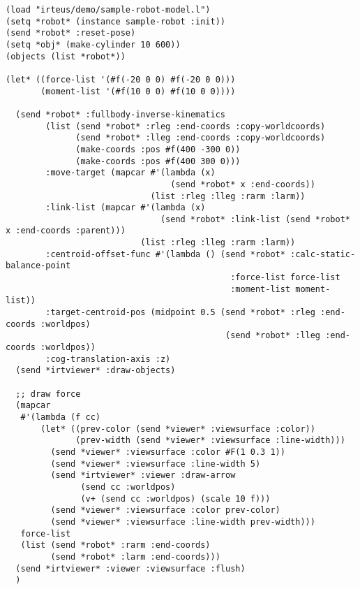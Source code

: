 {\baselineskip=10pt
\begin{verbatim}
(load "irteus/demo/sample-robot-model.l")
(setq *robot* (instance sample-robot :init))
(send *robot* :reset-pose)
(setq *obj* (make-cylinder 10 600))
(objects (list *robot*))

(let* ((force-list '(#f(-20 0 0) #f(-20 0 0)))
       (moment-list '(#f(10 0 0) #f(10 0 0))))

  (send *robot* :fullbody-inverse-kinematics
        (list (send *robot* :rleg :end-coords :copy-worldcoords)
              (send *robot* :lleg :end-coords :copy-worldcoords)
              (make-coords :pos #f(400 -300 0))
              (make-coords :pos #f(400 300 0)))
        :move-target (mapcar #'(lambda (x)
                                 (send *robot* x :end-coords))
                             (list :rleg :lleg :rarm :larm))
        :link-list (mapcar #'(lambda (x)
                               (send *robot* :link-list (send *robot* x :end-coords :parent)))
                           (list :rleg :lleg :rarm :larm))
        :centroid-offset-func #'(lambda () (send *robot* :calc-static-balance-point
                                             :force-list force-list
                                             :moment-list moment-list))
        :target-centroid-pos (midpoint 0.5 (send *robot* :rleg :end-coords :worldpos)
                                            (send *robot* :lleg :end-coords :worldpos))
        :cog-translation-axis :z)
  (send *irtviewer* :draw-objects)

  ;; draw force
  (mapcar
   #'(lambda (f cc)
       (let* ((prev-color (send *viewer* :viewsurface :color))
              (prev-width (send *viewer* :viewsurface :line-width)))
         (send *viewer* :viewsurface :color #F(1 0.3 1))
         (send *viewer* :viewsurface :line-width 5)
         (send *irtviewer* :viewer :draw-arrow
               (send cc :worldpos)
               (v+ (send cc :worldpos) (scale 10 f)))
         (send *viewer* :viewsurface :color prev-color)
         (send *viewer* :viewsurface :line-width prev-width)))
   force-list
   (list (send *robot* :rarm :end-coords)
         (send *robot* :larm :end-coords)))
  (send *irtviewer* :viewer :viewsurface :flush)
  )
\end{verbatim}
}

